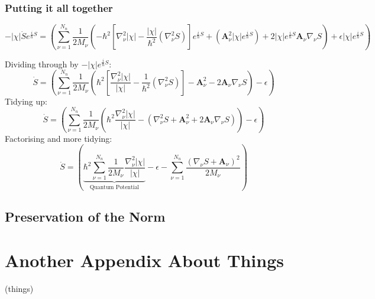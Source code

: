 \subsection{Putting it all together \label{ap:Polar_X_final}}
\begin{dmath*}
  - |\chi| \dot{S} e^{\frac{i}{\hbar}S} = \left( \sum_{\nu = 1}^{N_{n}} \frac{1}{2 M_{\nu}}\left(
  -\hbar^2\left[\nabla_{\nu}^2|\chi | - \frac{|\chi|}{\hbar^2}  (\nabla_{\nu}^2 S)\right] e^{\frac{i}{\hbar}S}
  + (\textbf{A}_{\nu}^2|\chi |e^{\frac{i}{\hbar}S})
  + 2 |\chi |e^{\frac{i}{\hbar}S} \textbf{A}_{\nu} \nabla_{\nu}S
 \right) + \epsilon |\chi |e^{\frac{i}{\hbar}S} \right)
\end{dmath*}

Dividing through by $-|\chi |e^{\frac{i}{\hbar}S}$:
\begin{dmath*}
  \dot{S} = \left( \sum_{\nu = 1}^{N_{n}} \frac{1}{2 M_{\nu}}\left(
  \hbar^2\left[\frac{\nabla_{\nu}^2|\chi |}{|\chi|} - \frac{1}{\hbar^2}  (\nabla_{\nu}^2 S)\right]
  - \textbf{A}_{\nu}^2
  - 2 \textbf{A}_{\nu} \nabla_{\nu}S
 \right) - \epsilon \right)
\end{dmath*}
Tidying up:
\begin{dmath*}
  \dot{S} = \left( \sum_{\nu = 1}^{N_{n}} \frac{1}{2 M_{\nu}}\left(
  \hbar^2\frac{\nabla_{\nu}^2|\chi |}{|\chi|} - \left( \nabla_{\nu}^2 S
  + \textbf{A}_{\nu}^2
  + 2 \textbf{A}_{\nu} \nabla_{\nu}S\right)
 \right) - \epsilon \right)
\end{dmath*}
Factorising and more tidying:
\begin{dmath*}
  \dot{S} = \left( \underbrace{\hbar^2 \sum_{\nu = 1}^{N_{n}} \frac{1}{2 M_{\nu}}
  \frac{\nabla_{\nu}^2|\chi |}{|\chi|}}_{\text{Quantum Potential}}  - \epsilon - \sum_{\nu = 1}^{N_{n}} \frac{(\nabla_{\nu}S
  + \textbf{A}_{\nu})^2}{2 M_{\nu}} \right)
\end{dmath*}









\section{Preservation of the Norm \label{ap:Norm_Pres}}




\chapter{Another Appendix About Things}
\label{appendixlabel2}
(things)

